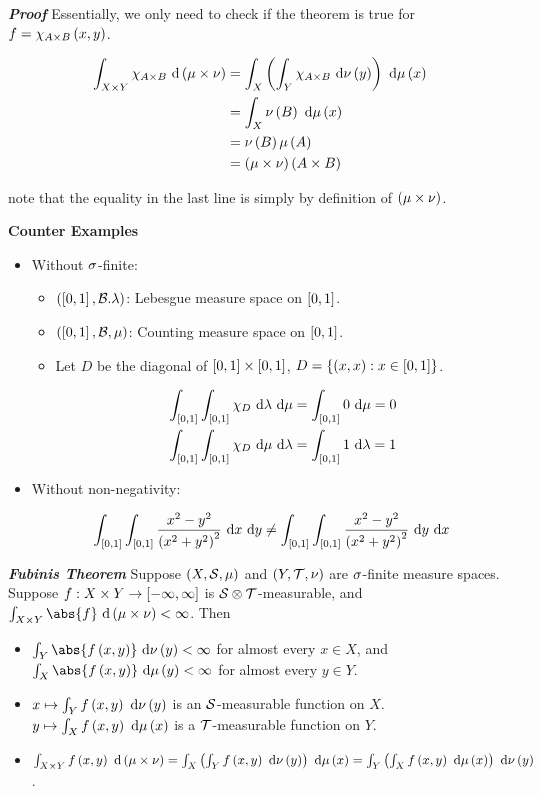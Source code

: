 \documentclass[
]{article}
\begin{document}
\emph{\textbf{Proof}} Essentially, we only need to check if the theorem
is true for \(f = \chi_{A\times B}\pr{x,y}\).

\[\ba
\int_{X\times Y}\chi_{A\times B}\d \mn & = \int_X\pr{\int_Y\chi_{A\times B} \dn\pr{y}}\dm\pr{x} \\
& = \int_X\nu\pr{B}\dm\pr{x} \\
& = \nu\pr{B}\lm{A}\\
& = \mn\pr{A\times B}
\ea\]

note that the equality in the last line is simply by definition of
\(\mn\).

\textbf{Counter Examples}

\begin{itemize}
\item
  Without \(\s\)-finite:

  \begin{itemize}
  \item
    \(\pr{\br{0,1},\B.\lambda}\): Lebesgue measure space on
    \(\br{0,1}\).
  \item
    \(\pr{\br{0,1},\B,\mu}\): Counting measure space on \(\br{0,1}\).
  \item
    Let \(D\) be the diagonal of \(\br{0,1}\times \br{0,1}\),
    \(D = \brace{\pr{x,x}:x\in\br{0,1}}\).

    \[\ba
    \int_{\br{0,1}}\int_{\br{0,1}}\chi_D\dl\dm & = \int_{\br{0,1}}0\dm = 0\\
    \int_{\br{0,1}}\int_{\br{0,1}}\chi_D\dm\dl & = \int_{\br{0,1}}1\dl = 1
    \ea\]
  \end{itemize}
\item
  Without non-negativity:

  \[\int_{\br{0,1}}\int_{\br{0,1}}\frac{x^2-y^2}{\pr{x^2+y^2}^2}\d x\d y\ne \int_{\br{0,1}}\int_{\br{0,1}}\frac{x^2-y^2}{\pr{x^2+y^2}^2}\d y\d x\]
\end{itemize}

\emph{\textbf{Fubini\textquotesingle s Theorem}} Suppose
\(\pr{X,\S,\mu}\) and \(\pr{Y,\T,\nu}\) are \(\s\)-finite measure
spaces. Suppose \(f:X\times Y\to \br{-\infty,\infty}\) is
\(\S\otimes \T\)-measurable, and
\(\int_{X\times Y}\abs{f}\d \mn<\infty\). Then

\begin{itemize}
\item
  \(\int_Y\abs{f\pr{x,y}}\dn\pr{y}<\infty\) for almost every \(x\in X\),
  and \(\int_X\abs{f\pr{x,y}}\dm\pr{y}<\infty\) for almost every
  \(y\in Y\).
\item
  \(x\mapsto \int_Yf\pr{x,y}\d\nu\pr{y}\) is an \(\S\)-measurable
  function on \(X\). \(y\mapsto \int_Xf\pr{x,y}\dm\pr{x}\) is a
  \(\T\)-measurable function on \(Y\).
\item
  \(\int_{X\times Y}f\pr{x,y}\d\pr{\mu\times \nu} = \int_X\pr{\int_Yf\pr{x,y}\dn\pr{y}}\dm\pr{x} = \int_Y\pr{\int_X f\pr{x,y}\dm\pr{x}}\dn\pr{y}\).
\end{itemize}
\end{document}
